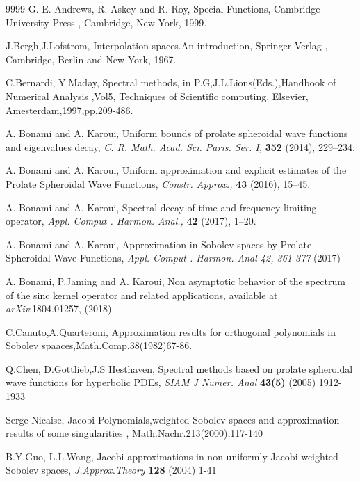 \documentclass[]{article}
\begin{document}
\begin{thebibliography}{9999}
 G. E. Andrews, R. Askey and  R. Roy, Special Functions,
Cambridge University Press , Cambridge, New York, 1999.

 J.Bergh,J.Lofstrom, Interpolation spaces.An introduction,
Springer-Verlag , Cambridge, Berlin and New York, 1967.

C.Bernardi, Y.Maday, Spectral methods, in P.G,J.L.Lions(Eds.),Handbook of Numerical Analysis ,Vol5, Techniques of Scientific computing, Elsevier, Amesterdam,1997,pp.209-486.


 A. Bonami and A. Karoui,  Uniform bounds of prolate spheroidal wave functions
and eigenvalues decay, {\it  C. R. Math. Acad. Sci. Paris. Ser. I,} {\bf 352}  (2014), 229--234.

 A. Bonami and A. Karoui, Uniform approximation and explicit estimates of the Prolate
Spheroidal Wave Functions, {\it Constr. Approx.,} {\bf 43} (2016), 15--45.

 A. Bonami and A. Karoui, Spectral decay of time and frequency limiting operator, {\it Appl. Comput . Harmon. Anal.,} {\bf 42} (2017), 1--20.

 A. Bonami and A. Karoui, Approximation in Sobolev spaces by Prolate Spheroidal Wave Functions, {\it Appl. Comput . Harmon. Anal 42, 361-377} (2017)


 A. Bonami, P.Jaming and A. Karoui, Non asymptotic behavior of the spectrum of the sinc kernel operator and related applications, available at  {\it arXiv}:1804.01257, (2018).

 C.Canuto,A.Quarteroni, Approximation results for orthogonal polynomials in Sobolev spaaces,Math.Comp.38(1982)67-86.

 Q.Chen, D.Gottlieb,J.S Hesthaven, Spectral methods based on prolate spheroidal wave functions for hyperbolic PDEs, {\it SIAM J Numer. Anal} {\bf 43(5) } (2005) 1912-1933

 Serge Nicaise, Jacobi Polynomials,weighted Sobolev spaces and approximation results of some singularities , Math.Nachr.213(2000),117-140


 B.Y.Guo, L.L.Wang, Jacobi approximations in non-uniformly Jacobi-weighted Sobolev spaces, {\it J.Approx.Theory} {\bf 128 } (2004) 1-41




\end{thebibliography}
\end{document}
